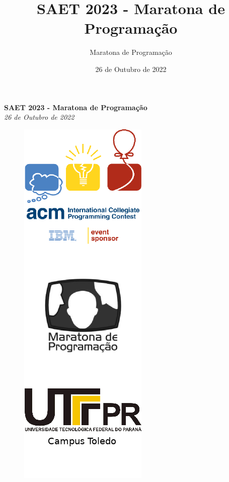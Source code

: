 \documentclass[12pt,oneside]{article} %
\title{SAET 2023 - Maratona de Programação}
\author{Maratona de Programação}
\date{26 de Outubro de 2022}
\begin{document}
\begin{center}
\textbf{\Huge SAET 2023 - Maratona de Programação} \\
\vspace{0.2cm}
\textit{26 de Outubro de 2022} \\
\vspace{1.0cm}
\begin{figure}[h!]
	\centering
 \includegraphics[scale=0.95]{capa.png}
\end{figure}
\vspace{1.0cm}
\vspace{1.0cm}
\end{center}
\end{document}
